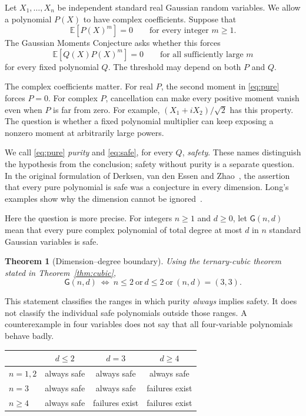 \documentclass[11pt]{article}
\newtheorem{theorem}{Theorem}[section]
\theoremstyle{definition}\newtheorem{definition}[theorem]{Definition}
\theoremstyle{remark}\newtheorem{remark}[theorem]{Remark}
\newcommand{\E}{\mathbb E}
\newcommand{\G}{\mathsf G}
\begin{document}
Let $X_1,\ldots,X_n$ be independent standard real Gaussian random
variables. We allow a polynomial $P(X)$ to have complex coefficients.
Suppose that
\begin{equation}\label{eq:pure}
  \E[P(X)^m]=0\qquad\text{for every integer }m\geq1.
\end{equation}
The Gaussian Moments Conjecture asks whether this forces
\begin{equation}\label{eq:safe}
  \E[Q(X)P(X)^m]=0\qquad\text{for all sufficiently large }m
\end{equation}
for every fixed polynomial $Q$. The threshold may depend on both $P$
and $Q$.

The complex coefficients matter. For real $P$, the second moment in
\eqref{eq:pure} forces $P=0$. For complex $P$, cancellation can make
every positive moment vanish even when $P$ is far from zero. For example,
$(X_1+iX_2)/\sqrt2$ has this property. The question is whether a fixed
polynomial multiplier can keep exposing a nonzero moment at arbitrarily
large powers.

We call \eqref{eq:pure} \emph{purity} and \eqref{eq:safe}, for every
$Q$, \emph{safety}. These names distinguish the hypothesis from the
conclusion; safety without purity is a separate question. In the original
formulation of Derksen, van den Essen and Zhao~\cite{DVEZ}, the assertion
that every pure polynomial is safe was a conjecture in every dimension.
Long's examples show why the dimension cannot be ignored~\cite{Long}.

Here the question is more precise. For integers $n\geq1$ and $d\geq0$,
let $\G(n,d)$ mean that every pure complex polynomial of total degree at
most $d$ in $n$ standard Gaussian variables is safe.

\begin{theorem}[Dimension--degree boundary]\label{thm:boundary}
Using the ternary-cubic theorem stated in Theorem~\ref{thm:cubic},
\[
 \boxed{\quad \G(n,d)\ \Longleftrightarrow\
 n\leq2\ \text{or}\ d\leq2\ \text{or}\ (n,d)=(3,3).\quad}
\]
\end{theorem}

This statement classifies the ranges in which purity \emph{always}
implies safety. It does not classify the individual safe polynomials
outside those ranges. A counterexample in four variables does not say
that all four-variable polynomials behave badly.

\begin{center}
\begin{tabular}{@{}lccc@{}}
\toprule
 & $d\leq2$ & $d=3$ & $d\geq4$\\
\midrule
$n=1,2$ & always safe & always safe & always safe\\
$n=3$ & always safe & always safe & failures exist\\
$n\geq4$ & always safe & failures exist & failures exist\\
\bottomrule
\end{tabular}
\end{center}
\end{document}
